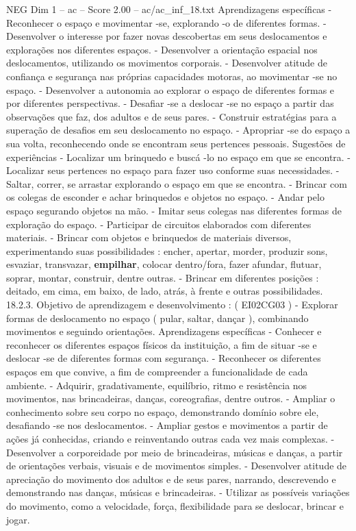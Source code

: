 \begin{textsample}{NEG Dim 1 – ac – Score 2.00 – ac/ac\_inf\_18.txt}
Aprendizagens específicas - Reconhecer o espaço e movimentar -se, explorando -o de diferentes formas. - Desenvolver o interesse por fazer novas descobertas em seus deslocamentos e explorações nos diferentes espaços. - Desenvolver a orientação espacial nos deslocamentos, utilizando os movimentos corporais. - Desenvolver atitude de confiança e segurança nas próprias capacidades motoras, ao movimentar -se no espaço. - Desenvolver a autonomia ao explorar o espaço de diferentes formas e por diferentes perspectivas. - Desafiar -se a deslocar -se no espaço a partir das observações que faz, dos adultos e de seus pares. - Construir estratégias para a superação de desafios em seu deslocamento no espaço. - Apropriar -se do espaço a sua volta, reconhecendo onde se encontram seus pertences pessoais.
Sugestões de experiências - Localizar um brinquedo e buscá -lo no espaço em que se encontra. - Localizar seus pertences no espaço para fazer uso conforme suas necessidades. - Saltar, correr, se arrastar explorando o espaço em que se encontra. - Brincar com os colegas de esconder e achar brinquedos e objetos no espaço. - Andar pelo espaço segurando objetos na mão. - Imitar seus colegas nas diferentes formas de exploração do espaço. - Participar de circuitos elaborados com diferentes materiais. - Brincar com objetos e brinquedos de materiais diversos, experimentando suas possibilidades : encher, apertar, morder, produzir sons, esvaziar, transvazar, \textbf{empilhar}, colocar dentro/fora, fazer afundar, flutuar, soprar, montar, construir, dentre outras. - Brincar em diferentes posições : deitado, em cima, em baixo, de lado, atrás, à frente e outras possibilidades. 18.2.3.
Objetivo de aprendizagem e desenvolvimento : ( EI02CG03 ) - Explorar formas de deslocamento no espaço ( pular, saltar, dançar ), combinando movimentos e seguindo orientações.
Aprendizagens específicas - Conhecer e reconhecer os diferentes espaços físicos da instituição, a fim de situar -se e deslocar -se de diferentes formas com segurança. - Reconhecer os diferentes espaços em que convive, a fim de compreender a funcionalidade de cada ambiente. - Adquirir, gradativamente, equilíbrio, ritmo e resistência nos movimentos, nas brincadeiras, danças, coreografias, dentre outros. - Ampliar o conhecimento sobre seu corpo no espaço, demonstrando domínio sobre ele, desafiando -se nos deslocamentos. - Ampliar gestos e movimentos a partir de ações já conhecidas, criando e reinventando outras cada vez mais complexas. - Desenvolver a corporeidade por meio de brincadeiras, músicas e danças, a partir de orientações verbais, visuais e de movimentos simples. - Desenvolver atitude de apreciação do movimento dos adultos e de seus pares, narrando, descrevendo e demonstrando nas danças, músicas e brincadeiras. - Utilizar as possíveis variações do movimento, como a velocidade, força, flexibilidade para se deslocar, brincar e jogar.

\end{textsample}
